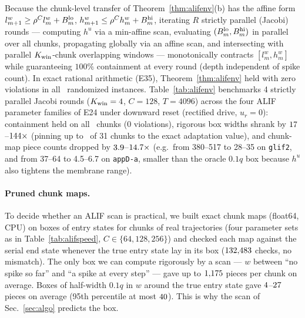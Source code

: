 \documentclass[10pt]{article}
\newcounter{algo}
\theoremstyle{remark}
\begin{document}
Because the chunk-level transfer of Theorem~\ref{thm:alifenv}(b) has the affine form $l_{m+1}^w\ge\rho^Cl_m^w+B_m^{\rm lo}$, $h_{m+1}^w\le\rho^Ch_m^w+B_m^{\rm hi}$, iterating $R$ strictly parallel (Jacobi) rounds --- computing $h^u$ via a min-affine scan, evaluating $(B_m^{\rm lo},B_m^{\rm hi})$ in parallel over all chunks, propagating globally via an affine scan, and intersecting with parallel $K_{\rm win}$-chunk overlapping windows --- monotonically contracts $[l_m^w,h_m^w]$ while guaranteeing $100\%$ containment at every round (depth independent of spike count). In exact rational arithmetic (E35), Theorem~\ref{thm:alifenv} held with zero violations in all \AlifEnvExactN\ randomized instances. Table~\ref{tab:alifenv} benchmarks 4 strictly parallel Jacobi rounds ($K_{\rm win}=4$, $C=128$, $T=4096$) across the four ALIF parameter families of E24 under downward reset (rectified drive, $u_r=0$): containment held on all \AlifEnvChunks\ chunks ($0$ violations), rigorous box widths shrank by $17$--$144\times$ (pinning up to \AlifEnvMaxPinned\ of 31 chunks to the exact adaptation value), and chunk-map piece counts dropped by $3.9$--$14.7\times$ (e.g.\ from 380--517 to 28--35 on \texttt{glif2}, and from 37--64 to 4.5--6.7 on \texttt{appD-a}, smaller than the oracle $0.1q$ box because $h^u$ also tightens the membrane range).

\begin{table}[!htbp]
\centering\small

\caption{ALIF rigorous dominance-envelope scan (Theorem~\ref{thm:alifenv}, 4 strictly parallel Jacobi rounds, $K_{\rm win}=4$, $C=128$, $T=4096$, downward reset $u_r=0$, $I_t\ge0$; 0 containment violations across all 384 chunks). Widths in units of $q$; ``pieces'': mean chunk-map pieces over chunks $1..31$ compared against the naive global rigorous box $[0,q(1-\rho^t)/(1-\rho)]$ and the oracle $0.1q$ box.}
\label{tab:alifenv}
\end{table}

\paragraph{Pruned chunk maps.} To decide whether an ALIF scan is practical, we built exact chunk maps (float64, CPU) on boxes of entry states for chunks of real trajectories (four parameter sets as in Table~\ref{tab:alifspeed}, $C\in\{64,128,256\}$) and checked each map against the serial end state whenever the true entry state lay in its box ($132{,}483$ checks, no mismatch). The only box we can compute rigorously by a scan --- $w$ between ``no spike so far'' and ``a spike at every step'' --- gave up to $1{,}175$ pieces per chunk on average. Boxes of half-width $0.1q$ in $w$ around the true entry state gave $4$--$27$ pieces on average (95th percentile at most $40$). This is why the scan of Sec.~\ref{sec:algo} predicts the box.
\end{document}

